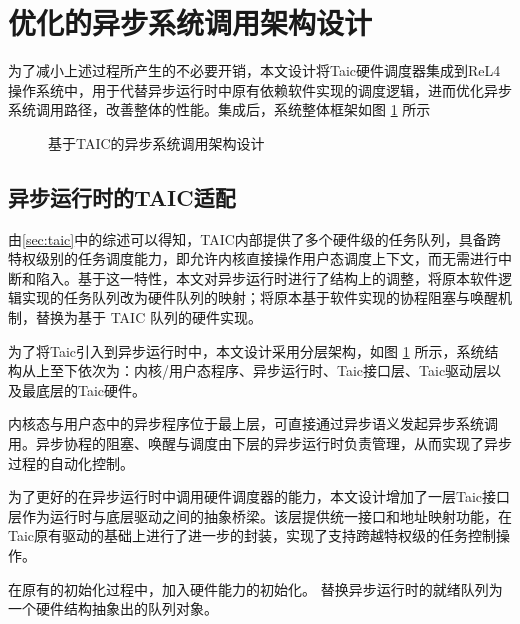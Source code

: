 \section{优化的异步系统调用架构设计}

为了减小上述过程所产生的不必要开销，本文设计将Taic硬件调度器集成到ReL4操作系统中，用于代替异步运行时中原有依赖软件实现的调度逻辑，进而优化异步系统调用路径，改善整体的性能。集成后，系统整体框架如图 \ref{taicsyscall} 所示

\begin{figure}[htbp]
    \centering
    
    \caption{基于TAIC的异步系统调用架构设计}\label{taicsyscall}
\end{figure}

\subsection{异步运行时的TAIC适配}

由\ref{sec:taic}中的综述可以得知，TAIC内部提供了多个硬件级的任务队列，具备跨特权级别的任务调度能力，即允许内核直接操作用户态调度上下文，而无需进行中断和陷入。基于这一特性，本文对异步运行时进行了结构上的调整，将原本软件逻辑实现的任务队列改为硬件队列的映射；将原本基于软件实现的协程阻塞与唤醒机制，替换为基于 TAIC 队列的硬件实现。


为了将Taic引入到异步运行时中，本文设计采用分层架构，如图 \ref{taicsyscall} 所示，系统结构从上至下依次为：内核/用户态程序、异步运行时、Taic接口层、Taic驱动层以及最底层的Taic硬件。

内核态与用户态中的异步程序位于最上层，可直接通过异步语义发起异步系统调用。异步协程的阻塞、唤醒与调度由下层的异步运行时负责管理，从而实现了异步过程的自动化控制。

为了更好的在异步运行时中调用硬件调度器的能力，本文设计增加了一层Taic接口层作为运行时与底层驱动之间的抽象桥梁。该层提供统一接口和地址映射功能，在Taic原有驱动的基础上进行了进一步的封装，实现了支持跨越特权级的任务控制操作。


在原有的初始化过程中，加入硬件能力的初始化。
替换异步运行时的就绪队列为一个硬件结构抽象出的队列对象。



